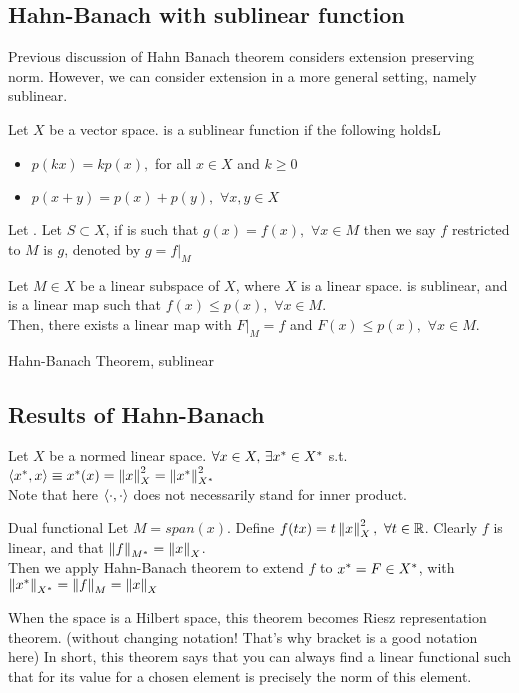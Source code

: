 \subsection{Hahn-Banach with sublinear function}
Previous discussion of Hahn Banach theorem considers extension preserving norm. However, we can consider extension in a more general setting, namely sublinear.
\begin{definition}\label{sublinear map}\rm\nextline
	Let $X$ be a vector space.  is a sublinear function if the following holdsL
	\begin{itemize}
		\item $p(kx)=kp(x),$ for all $x\in X$ and $k\geq0$
		\item $p(x+y)=p(x)+p(y),\,\,\forall x,y\in X$
	\end{itemize}
\end{definition}

\begin{definition}[Restriction]\rm\nextline
	Let . Let $S\subset X$, if  is such that $g(x)=f(x),\,\,\forall x\in M$ then we say $f$ restricted to $M$ is $g$, denoted by $g=f|_M$
\end{definition}
\begin{theorem}\rm\nextline
	Let $M\in X$ be a linear subspace of $X$, where $X$ is a linear space.  is sublinear, and  is a linear map such that $f(x)\leq p(x),\,\,\forall x\in M$.\\
	Then, there exists a linear map  with $F|_M=f$ and $F(x)\leq p(x),\,\,\forall x\in M$.
	\begin{pf}{Hahn-Banach Theorem, sublinear}{}
		\placeholder
	\end{pf}
\end{theorem}

\subsection{Results of Hahn-Banach}
\begin{theorem}\label{Dual functional}\rm\nextline
	Let $X$ be a normed linear space. $\forall x\in X,\,\exists x^*\in {X}^*$ s.t. $\left<{{x}^*},{x}\right>\equiv{x}^*(x)=\left\|{x}\right\|^2_X=\left\|{{x}^*}\right\|^2_{{X}^*}$\\
	Note that here $\left<{\cdot},{\cdot}\right>$ does not necessarily stand for inner product.
	\begin{pf}{Dual functional}{}
		Let $M=span(x)$. Define $f(tx)=t\left\|{x}\right\|^2_X,\,\,\forall t\in \mathbb{R}$. Clearly $f$ is linear, and that $\left\|{f}\right\|_{{M}^*}=\left\|{x}\right\|_X$. \\
		Then we apply Hahn-Banach theorem to extend $f$ to ${x}^*=F\in {X}^*$, with $\left\|{{x}^*}\right\|_{{X}^*}=\left\|{f}\right\|_M=\left\|{x}\right\|_X$
	\end{pf}
\end{theorem}
When the space is a Hilbert space, this theorem becomes Riesz representation theorem. (without changing notation! That's why bracket is a good notation here) In short, this theorem says that you can always find a linear functional such that for its value for a chosen element is precisely the norm of this element.


